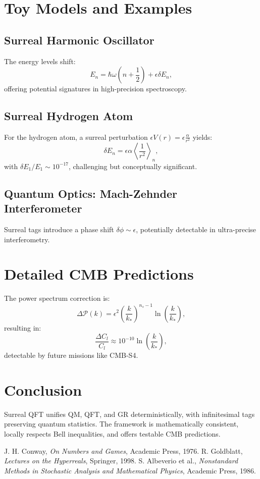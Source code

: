 \documentclass{article}
\begin{document}
\section{Toy Models and Examples}
\subsection{Surreal Harmonic Oscillator}
The energy levels shift:
\begin{equation}
E_n = \hbar \omega \left( n + \frac{1}{2} \right) + \epsilon \delta E_n,
\end{equation}
offering potential signatures in high-precision spectroscopy.

\subsection{Surreal Hydrogen Atom}
For the hydrogen atom, a surreal perturbation \(\epsilon V(r) = \epsilon \frac{\alpha}{r^2}\) yields:
\begin{equation}
\delta E_n = \epsilon \alpha \left\langle \frac{1}{r^2} \right\rangle_n,
\end{equation}
with \(\delta E_1 / E_1 \sim 10^{-17}\), challenging but conceptually significant.

\subsection{Quantum Optics: Mach-Zehnder Interferometer}
Surreal tags introduce a phase shift \(\delta \phi \sim \epsilon\), potentially detectable in ultra-precise interferometry.

\section{Detailed CMB Predictions}
The power spectrum correction is:
\begin{equation}
\Delta \mathcal{P}(k) = \epsilon^2 \left( \frac{k}{k_*} \right)^{n_s-1} \ln \left( \frac{k}{k_*} \right),
\end{equation}
resulting in:
\begin{equation}
\frac{\Delta C_l}{C_l} \approx 10^{-10} \ln \left( \frac{k}{k_*} \right),
\end{equation}
detectable by future missions like CMB-S4.

\section{Conclusion}
Surreal QFT unifies QM, QFT, and GR deterministically, with infinitesimal tags preserving quantum statistics. The framework is mathematically consistent, locally respects Bell inequalities, and offers testable CMB predictions.

\begin{thebibliography}{9}
J. H. Conway, \emph{On Numbers and Games}, Academic Press, 1976.
R. Goldblatt, \emph{Lectures on the Hyperreals}, Springer, 1998.
S. Albeverio et al., \emph{Nonstandard Methods in Stochastic Analysis and Mathematical Physics}, Academic Press, 1986.
\end{thebibliography}
\end{document}
